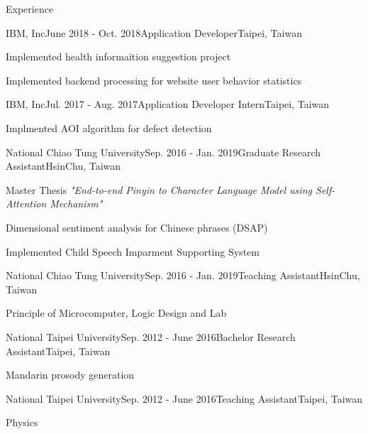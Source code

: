 \documentclass{resume} %
\begin{document}
\begin{rSection}{Experience}

\begin{rSubsection}{IBM, Inc}{June 2018 - Oct. 2018}{Application Developer}{Taipei, Taiwan}
\item Implemented health informaition suggestion project 
\item Implemented backend processing for website user behavior statistics 
\end{rSubsection}

\begin{rSubsection}{IBM, Inc}{Jul. 2017 - Aug. 2017}{Application Developer Intern}{Taipei, Taiwan}
\item Implmented AOI algorithm for defect detection 
\end{rSubsection}

\begin{rSubsection}{National Chiao Tung University}{Sep. 2016 - Jan. 2019}{Graduate Research Assistant}{HsinChu, Taiwan}
\item Master Thesis {\em "End-to-end Pinyin to Character Language Model using Self-Attention Mechanism"}
\item Dimensional sentiment analysis for Chinese phrases (DSAP) \cite{lee2017nctu}
\item Implemented Child Speech Imparment Supporting System 
\end{rSubsection}

\begin{rSubsection}{National Chiao Tung University}{Sep. 2016 - Jan. 2019}{Teaching Assistant}{HsinChu, Taiwan}
\item Principle of Microcomputer, Logic Design and Lab
\end{rSubsection}

\begin{rSubsection}{National Taipei University}{Sep. 2012 - June 2016}{Bachelor Research Assistant}{Taipei, Taiwan}
\item Mandarin prosody generation \cite{hung2014investigation}\cite{chiang2019punctuation}
\end{rSubsection}

\begin{rSubsection}{National Taipei University}{Sep. 2012 - June 2016}{Teaching Assistant}{Taipei, Taiwan}
\item Physics
\end{rSubsection}


\end{rSection}
\end{document}
